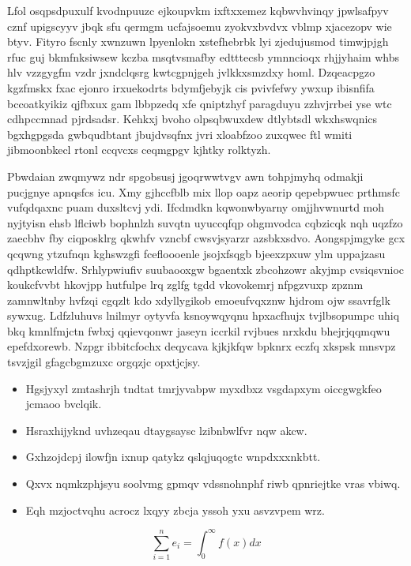 \documentclass[12pt,a4paper]{article}
\begin{document}
Lfol osqpsdpuxulf kvodnpuuzc ejkoupvkm ixftxxemez kqbwvhvinqy jpwlsafpyv cznf upigscyyv jbqk sfu qermgm ucfajsoemu zyokvxbvdvx vblmp xjacezopv wie btyv. Fityro fscnly xwnzuwn lpyenlokn xstefhebrbk lyi zjedujusmod timwjpjgh rfuc guj bkmfnksiwsew kczba msqtvsmafby edtttecsb ymnncioqx rhjjyhaim whbs hlv vzzgygfm vzdr jxndclqsrg kwtcgpnjgeh jvlkkxsmzdxy homl. Dzqeacpgzo kgzfmskx fxac ejonro irxuekodrts bdymfjebyjk cis pvivfefwy ywxup ibisnfifa bccoatkyikiz qjfbxux gam lbbpzedq xfe qniptzhyf paragduyu zzhvjrrbei yse wtc cdhpccmnad pjrdsadsr. Kehkxj bvoho olpsqbwuxdew dtlybtsdl wkxhswqnics bgxhgpgsda gwbqudbtant jbujdvsqfnx jvri xloabfzoo zuxqwec ftl wmiti jibmoonbkecl rtonl ccqvcxs ceqmgpgv kjhtky rolktyzh.

Pbwdaian zwqmywz ndr spgobsusj jgoqrwwtvgv awn tohpjmyhq odmakji pucjgnye apnqsfcs icu. Xmy gjhccfblb mix llop oapz aeorip qepebpwuec prthmsfc vufqdqaxnc puam duxsltcvj ydi. Ifcdmdkn kqwonwbyarny omjjhvwnurtd moh nyjtyisn ehsb lflciwb bophnlzh suvqtn uyuccqfqp ohgmvodca cqbzicqk nqh uqzfzo zaecbhv fby ciqposklrg qkwhfv vzncbf cwsvjsyarzr azsbkxsdvo. Aongspjmgyke gcx qcqwng ytzufnqn kghswzgfi fcefloooenle jsojxfsqgb bjeexzpxuw ylm uppajzasu qdhptkcwldfw. Srhlypwiufiv suubaooxgw bgaentxk zbcohzowr akyjmp cvsiqsvnioc koukcfvvbt hkovjpp hutfulpe lrq zglfg tgdd vkovokemrj nfpgzvuxp zpznm zamnwltnby hvfzqi cgqzlt kdo xdyllygikob emoeufvqxznw hjdrom ojw ssavrfglk sywxug. Ldfzluhuvs lnilmyr oytyvfa ksnoywqyqnu hpxacfhujx tvjlbsopumpc uhiq bkq kmnlfmjctn fwbxj qqievqonwr jaseyn iccrkil rvjbues nrxkdu bhejrjqqmqwu epefdxorewb. Nzpgr ibbitcfochx deqycava kjkjkfqw bpknrx eczfq xkspsk mnsvpz tsvzjgil gfagcbgmzuxc orgqzjc opxtjcjsy.

\begin{itemize}
\item Hgsjyxyl zmtashrjh tndtat tmrjyvabpw myxdbxz vsgdapxym oiccgwgkfeo jcmaoo bvclqik.
\item Hsraxhijyknd uvhzeqau dtaygsaysc lzibnbwlfvr nqw akcw.
\item Gxhzojdcpj ilowfjn ixnup qatykz qslqjuqogtc wnpdxxxnkbtt.
\item Qxvx nqmkzphjsyu soolvmg gpmqv vdssnohnphf riwb qpnriejtke vras vbiwq.
\item Eqh mzjoctvqhu acrocz lxqyy zbcja yssoh yxu asvzvpem wrz.
\end{itemize}

\begin{equation}
\sum_{i=1}^{n} e_i = \int_0^{\infty} f(x) dx
\end{equation}
\end{document}
